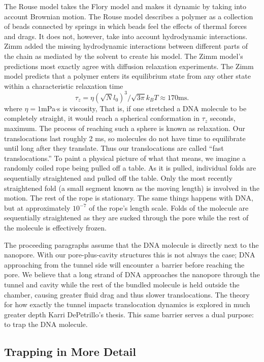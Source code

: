 \documentclass[aps,prl,preprint,groupedaddress]{revtex4}
\begin{document}
The Rouse model takes the Flory model and makes it dynamic by taking into account Brownian motion.
The Rouse model describes a polymer as a collection of beads connected by springs in which beads feel the effects of thermal forces and drags.
It does not, however, take into account hydrodynamic interactions.
Zimm added the missing hydrodynamic interactions between different parts of the chain as mediated by the solvent to create his model.
The Zimm model's predictions most exactly agree with diffusion relaxation experiments.
The Zimm model predicts that a polymer enters its equilibrium state from any other state within a characteristic relaxation time\cite{zimm-eqn}
\begin{equation}\tau_z=\eta (\sqrt{N}l_0)^3/\sqrt{3\pi}k_BT \approx 170 \mathrm{ms}.\end{equation}
where $\eta = 1$mPa$\cdot$s is viscosity, 
That is, if one stretched a DNA molecule to be completely straight, it would reach a spherical conformation in \(\tau_z\) seconds, maximum.
The process of reaching such a sphere is known as relaxation.
Our translocations last roughly 2 ms, so molecules do not have time to equilibrate until long after they translate.
Thus our translocations are called ``fast translocations.'' To paint a physical picture of what that means, we imagine a randomly coiled rope being pulled off a table.
As it is pulled, individual folds are sequentially straightened and pulled off the table.
Only the most recently straightened fold (a small segment known as the moving length) is involved in the motion.
The rest of the rope is stationary.
The same things happens with DNA, but at approximately $10^{-7}$ of the rope's length scale.
Folds of the molecule are sequentially straightened as they are sucked through the pore while the rest of the molecule is effectively frozen.

The proceeding paragraphs assume that the DNA molecule is directly next to the nanopore.
With our pore-plus-cavity structures this is not always the case; DNA approaching from the tunnel side will encounter a barrier before reaching the pore.
We believe that a long strand of DNA approaches the nanopore through the tunnel and cavity while the rest of the bundled molecule is held outside the chamber, causing greater fluid drag and thus slower translocations.
The theory for how exactly the tunnel impacts translocation dynamics is explored in much greater depth Karri DePetrillo's thesis.
This same barrier serves a dual purpose: to trap the DNA molecule.

\subsection{Trapping in More Detail}
\end{document}
